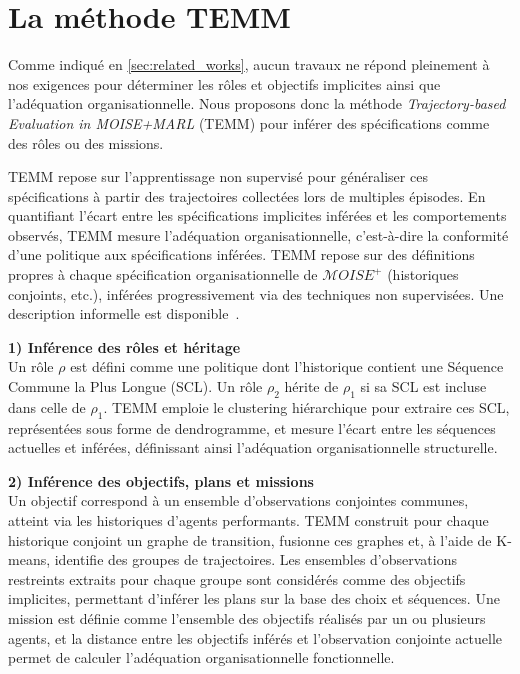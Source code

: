 \documentclass[francais,ROIA,Unicode,manuscript]{cedram}
\begin{document}

\section{La méthode TEMM}
\label{sec:TEMM_algorithm}

Comme indiqué en \autoref{sec:related_works}, aucun travaux ne répond pleinement à nos exigences pour déterminer les rôles et objectifs implicites ainsi que l'adéquation organisationnelle. Nous proposons donc la méthode \textit{Trajectory-based Evaluation in MOISE+MARL} (TEMM) pour inférer des spécifications comme des rôles ou des missions.

TEMM repose sur l'apprentissage non supervisé pour généraliser ces spécifications à partir des trajectoires collectées lors de multiples épisodes. En quantifiant l'écart entre les spécifications implicites inférées et les comportements observés, TEMM mesure l'adéquation organisationnelle, c'est-à-dire la conformité d'une politique aux spécifications inférées. TEMM repose sur des définitions propres à chaque spécification organisationnelle de \(\mathcal{M}OISE^+\) (historiques conjoints, etc.), inférées progressivement via des techniques non supervisées. Une description informelle est disponible~\hyperref[fn:github]{\footnotemark[2]}.


\noindent\textbf{1) Inférence des rôles et héritage} \\
Un rôle \(\rho\) est défini comme une politique dont l'historique contient une Séquence Commune la Plus Longue (SCL). Un rôle \(\rho_2\) hérite de \(\rho_1\) si sa SCL est incluse dans celle de \(\rho_1\). TEMM emploie le clustering hiérarchique pour extraire ces SCL, représentées sous forme de dendrogramme, et mesure l'écart entre les séquences actuelles et inférées, définissant ainsi l'adéquation organisationnelle structurelle.

\noindent\textbf{2) Inférence des objectifs, plans et missions} \\
Un objectif correspond à un ensemble d'observations conjointes communes, atteint via les historiques d'agents performants. TEMM construit pour chaque historique conjoint un graphe de transition, fusionne ces graphes et, à l'aide de K-means, identifie des groupes de trajectoires. Les ensembles d'observations restreints extraits pour chaque groupe sont considérés comme des objectifs implicites, permettant d'inférer les plans sur la base des choix et séquences. Une mission est définie comme l'ensemble des objectifs réalisés par un ou plusieurs agents, et la distance entre les objectifs inférés et l'observation conjointe actuelle permet de calculer l'adéquation organisationnelle fonctionnelle.
\end{document}
